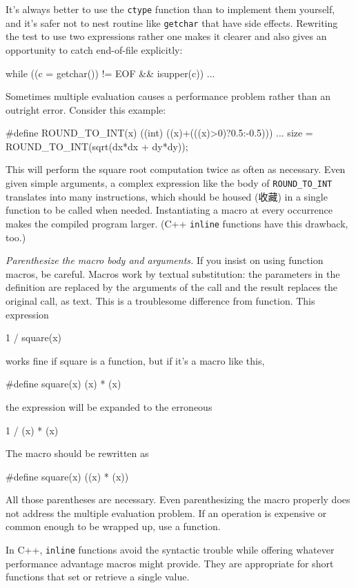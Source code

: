 It's always better to use the \verb'ctype' function than to implement them
yourself, and it's safer not to nest routine like \verb'getchar' that have
side effects. Rewriting the test to use two expressions rather one makes it
clearer and also gives an opportunity to catch end-of-file explicitly:
\begin{wellcode}
    while ((c = getchar()) != EOF && isupper(c))
        ...
\end{wellcode}

Sometimes multiple evaluation causes a performance problem rather than an
outright error. Consider this example:
\begin{badcode}
    #define ROUND_TO_INT(x) ((int) ((x)+(((x)>0)?0.5:-0.5)))
        ...
    size = ROUND_TO_INT(sqrt(dx*dx + dy*dy));
\end{badcode}
This will perform the square root computation twice as often as necessary.
Even given simple arguments, a complex expression like the body of
\verb'ROUND_TO_INT' translates into many instructions, which should be
housed (收藏) in a single function to be called when needed. Instantiating a
macro at every occurrence makes the compiled program larger. (C++
\verb'inline' functions have this drawback, too.)

\emph{Parenthesize the macro body and arguments.} If you insist on using
function macros, be careful. Macros work by textual substitution: the
parameters in the definition are replaced by the arguments of the call and
the result replaces the original call, as text. This is a troublesome
difference from function. This expression
\begin{wellcode}
    1 / square(x)
\end{wellcode}
works fine if square is a function, but if it's a macro like this,
\begin{badcode}
    #define square(x) (x) * (x)
\end{badcode}
the expression will be expanded to the erroneous
\begin{badcode}
    1 / (x) * (x)
\end{badcode}
The macro should be rewritten as 
\begin{wellcode}
    #define square(x) ((x) * (x))
\end{wellcode}
All those parentheses are necessary. Even parenthesizing the macro properly
does not address the multiple evaluation problem. If an operation is
expensive or common enough to be wrapped up, use a function.

In C++, \verb'inline' functions avoid the syntactic trouble while offering
whatever performance advantage macros might provide. They are appropriate
for short functions that set or retrieve a single value.

